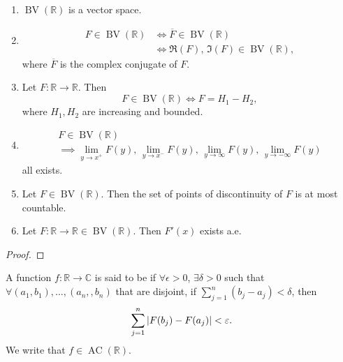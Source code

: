 \documentclass[notoc,notitlepage]{tufte-book}
\DeclareMathOperator{\AC}{AC}
\DeclareMathOperator{\BV}{BV}
\begin{document}
\begin{thm}\label{thm:properties_of_functions_of_bounded_variation}
  \begin{enumerate}
    \item $\BV(\mathbb{R})$ is a vector space.
    \item \begin{align*}
        F \in \BV(\mathbb{R}) &\iff \overline{F} \in \BV(\mathbb{R}) \\
          &\iff \Re(F),\, \Im(F) \in \BV(\mathbb{R}),
      \end{align*}
      where $\overline{F}$ is the complex conjugate of $F$.
    \item Let $F : \mathbb{R} \to \mathbb{R}$. Then
      \begin{equation*}
        F \in \BV(\mathbb{R}) \iff F = H_1 - H_2,
      \end{equation*}
      where $H_1, H_2$ are increasing and bounded.
    \item \begin{gather*}
        F \in \BV(\mathbb{R}) \\
        \implies \lim_{y \to x^+} F(y),\, \lim_{y \to x^-} F(y),\,
          \lim_{y \to \infty} F(y),\, \lim_{y \to -\infty} F(y)
      \end{gather*}
      all exists.
    \item Let $F \in \BV(\mathbb{R})$. Then the set of points of discontinuity
      of $F$ is at most countable.
    \item Let $F : \mathbb{R} \to \mathbb{R} \in \BV(\mathbb{R})$.
      Then $F'(x)$ exists a.e.
  \end{enumerate}
\end{thm}

\begin{proof}
\end{proof}

\begin{defn}\label{defn:absolutely_continuous_functions}
  A function $f : \mathbb{R} \to \mathbb{C}$ is said to be
   if $\forall \epsilon > 0$, $\exists \delta > 0$
  such that $\forall (a_1, b_1), \ldots, (a_n,, b_n)$ that are disjoint,
  if $\sum_{j=1}^{n} (b_j - a_j) < \delta$, then
  \begin{equation*}
    \sum_{j=1}^{n} \left|F(b_j) - F(a_j)\right| < \varepsilon.
  \end{equation*}
  We write that $f \in \AC(\mathbb{R})$.
\end{defn}
\end{document}
